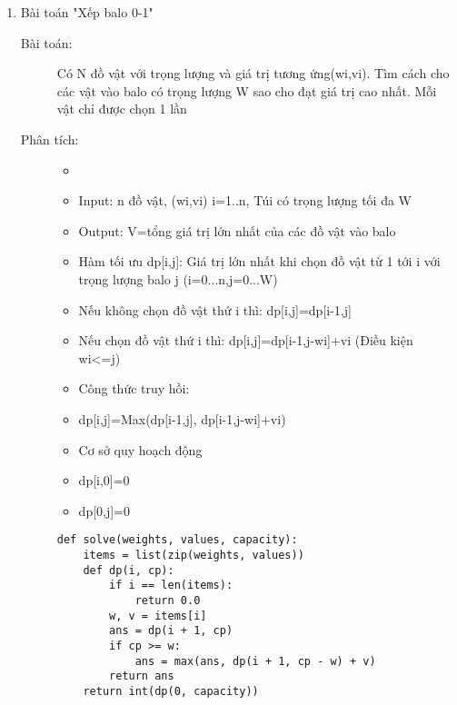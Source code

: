\begin{enumerate}
    \item Bài toán "Xếp balo 0-1"
    \begin{description}
        \item[Bài toán:]Có N đồ vật với trọng lượng và giá trị tương ứng(wi,vi). Tìm cách cho các vật vào balo có trọng lượng W sao cho đạt giá trị cao
        nhất. Mỗi vật chỉ được chọn 1 lần
        \item[Phân tích:]
            \begin{itemize}
                \item[]
                \item Input: n đồ vật, (wi,vi) i=1..n, Túi có trọng lượng tối đa W
                \item Output: V=tổng giá trị lớn nhất của các đồ vật vào balo
                \item Hàm tối ưu dp[i,j]: Giá trị lớn nhất khi chọn đồ vật từ 1 tới i với trọng lượng balo j (i=0...n,j=0...W)
                \item[]Nếu không chọn đồ vật thứ i thì: dp[i,j]=dp[i-1,j]
                \item[]Nếu chọn đồ vật thứ i thì: dp[i,j]=dp[i-1,j-wi]+vi (Điều kiện wi<=j)
                \item Công thức truy hồi: 
                \item[]dp[i,j]=Max(dp[i-1,j], dp[i-1,j-wi]+vi)
                \item Cơ sở quy hoạch động
                \item[]dp[i,0]=0
                \item[]dp[0,j]=0
            \end{itemize}
        
        \begin{lstlisting}[style=algo]
def solve(weights, values, capacity):
    items = list(zip(weights, values))
    def dp(i, cp):
        if i == len(items):
            return 0.0
        w, v = items[i]
        ans = dp(i + 1, cp)
        if cp >= w:
            ans = max(ans, dp(i + 1, cp - w) + v)
        return ans
    return int(dp(0, capacity))
        \end{lstlisting}
    \end{description}
\end{enumerate}  